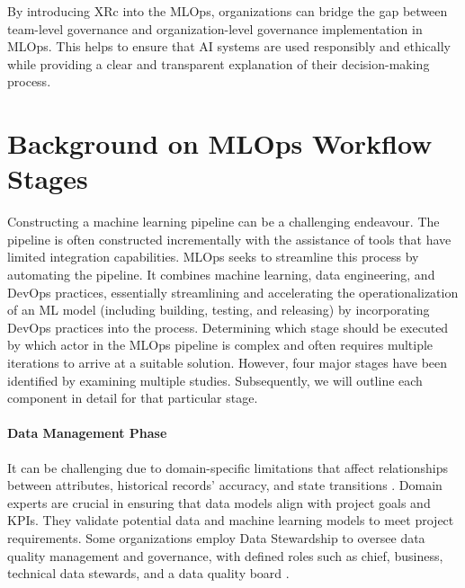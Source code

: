 \documentclass[conference]{IEEEtran}
\begin{document}
By introducing XRc into the MLOps, organizations can bridge the gap between team-level governance and organization-level governance implementation in MLOps. This helps to ensure that AI systems are used responsibly and ethically while providing a clear and transparent explanation of their decision-making process.

\section{Background on MLOps Workflow Stages}
Constructing a machine learning pipeline can be a challenging endeavour. The pipeline is often constructed incrementally with the assistance of tools that have limited integration capabilities. MLOps seeks to streamline this process by automating the pipeline. It combines machine learning, data engineering, and DevOps practices, essentially streamlining and accelerating the operationalization of an ML model (including building, testing, and releasing) by incorporating DevOps practices into the process. 
Determining which stage should be executed by which actor in the MLOps pipeline is complex and often requires multiple iterations to arrive at a suitable solution. However, four major stages have been identified by examining multiple studies. Subsequently, we will outline each component in detail for that particular stage.
\paragraph{Data Management Phase} It can be challenging due to domain-specific limitations \cite{maydanchik2007data} that affect relationships between attributes, historical records' accuracy, and state transitions \cite{taleb2018big}. Domain experts are crucial in ensuring that data models align with project goals and KPIs. They validate potential data and machine learning models to meet project requirements. Some organizations employ Data Stewardship to oversee data quality management and governance, with defined roles such as chief, business, technical data stewards, and a data quality board \cite{mons2018data}.
\end{document}
